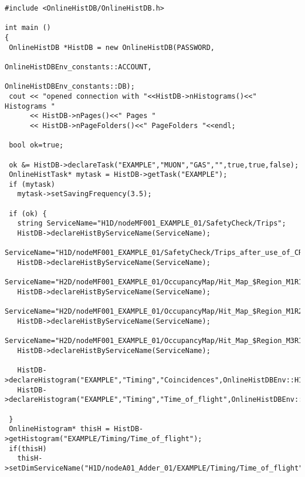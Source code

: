 \documentclass{lhcbnote}
\begin{document}
\begin{verbatim}
#include <OnlineHistDB/OnlineHistDB.h>

int main ()
{
 OnlineHistDB *HistDB = new OnlineHistDB(PASSWORD,
                                        OnlineHistDBEnv_constants::ACCOUNT,
                                        OnlineHistDBEnv_constants::DB);
 cout << "opened connection with "<<HistDB->nHistograms()<<" Histograms "
      << HistDB->nPages()<<" Pages "
      << HistDB->nPageFolders()<<" PageFolders "<<endl;
    
 bool ok=true;
  
 ok &= HistDB->declareTask("EXAMPLE","MUON","GAS","",true,true,false);
 OnlineHistTask* mytask = HistDB->getTask("EXAMPLE");
 if (mytask)
   mytask->setSavingFrequency(3.5);
  
 if (ok) {
   string ServiceName="H1D/nodeMF001_EXAMPLE_01/SafetyCheck/Trips";
   HistDB->declareHistByServiceName(ServiceName);
   ServiceName="H1D/nodeMF001_EXAMPLE_01/SafetyCheck/Trips_after_use_of_CRack";
   HistDB->declareHistByServiceName(ServiceName);
   ServiceName="H2D/nodeMF001_EXAMPLE_01/OccupancyMap/Hit_Map_$Region_M1R1";
   HistDB->declareHistByServiceName(ServiceName); 
   ServiceName="H2D/nodeMF001_EXAMPLE_01/OccupancyMap/Hit_Map_$Region_M1R2";
   HistDB->declareHistByServiceName(ServiceName);
   ServiceName="H2D/nodeMF001_EXAMPLE_01/OccupancyMap/Hit_Map_$Region_M3R1";
   HistDB->declareHistByServiceName(ServiceName);
   
   HistDB->declareHistogram("EXAMPLE","Timing","Coincidences",OnlineHistDBEnv::H1D);
   HistDB->declareHistogram("EXAMPLE","Timing","Time_of_flight",OnlineHistDBEnv::H1D);
   
 }
 OnlineHistogram* thisH = HistDB->getHistogram("EXAMPLE/Timing/Time_of_flight");
 if(thisH)
   thisH->setDimServiceName("H1D/nodeA01_Adder_01/EXAMPLE/Timing/Time_of_flight");
\end{verbatim}
\end{document}
